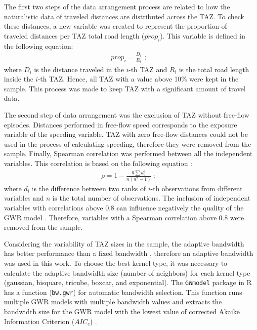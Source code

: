 The first two steps of the data arrangement process are related to how the naturalistic data of traveled distances are distributed across the TAZ. To check these distances, a new variable was created to represent the proportion of traveled distances per TAZ total road length ($prop_i$). This variable is defined in the following equation: \begin{align}
    prop_i = \frac{D_i}{R_i} \mbox{ ;}
\end{align} where $D_i$ is the distance traveled in the $i$-th TAZ and $R_i$ is the total road length inside the $i$-th TAZ. Hence, all TAZ with a value above 10\% were kept in the sample. This process was made to keep TAZ with a significant amount of travel data.

The second step of data arrangement was the exclusion of TAZ without free-flow episodes. Distances performed in free-flow speed corresponds to the exposure variable of the speeding variable. TAZ with zero free-flow distances could not be used in the process of calculating speeding, therefore they were removed from the sample. Finally, Spearman correlation was performed between all the independent variables. This correlation is based on the following equation \cite{Dodge2010}: \begin{align}
    \rho = 1 - \frac{6 \sum d_i^2}{n \left( n^2 - 1\right)} \mbox{ ;}
\end{align} where $d_i$ is the difference between two ranks of $i$-th observations from different variables and $n$ is the total number of observations. The inclusion of independent variables with correlations above 0.8 can influence negatively the quality of the GWR model \cite{Gollini2013}. Therefore, variables with a Spearman correlation above 0.8 were removed from the sample. 

Considering the variability of TAZ sizes in the sample, the adaptive bandwidth has better performance than a fixed bandwidth \cite{Huang2018}, therefore an adaptive bandwidth was used in this work. To choose the best kernel type, it was necessary to calculate the adaptive bandwidth size (number of neighbors) for each kernel type (gaussian, bisquare, tricube, boxcar, and exponential). The \verb|GWmodel| package in R has a function (\verb|bw.gwr|) for automatic bandwidth selection. This function runs multiple GWR models with multiple bandwidth values and extracts the bandwidth size for the GWR model with the lowest value of corrected Akaike Information Criterion ($AIC_c$) \cite{Gollini2013}.

